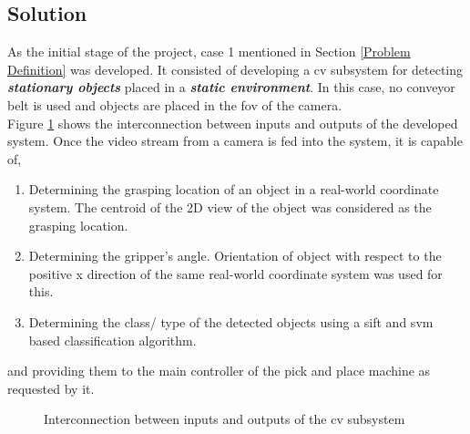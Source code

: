 \documentclass[a4paper,12pt]{report}%
\begin{document}
\subsection{Solution}
\label{cv_subsystem}
As the initial stage of the project, case 1 mentioned in Section \ref{Problem Definition} was developed. It consisted of developing a \ac{cv} subsystem for detecting \textbf{\textit{stationary objects}} placed in a \textbf{\textit{static environment}}. In this case, no conveyor belt is used and objects are placed in the \ac{fov} of the camera.\\

Figure \ref{fig:ioprocess} shows the interconnection between inputs and outputs of the developed system. Once the video stream from a camera is fed into the system, it is capable of,



\begin{enumerate}
	\item Determining the grasping location of an object in a real-world coordinate system. The centroid of the 2D view of the object was considered as the grasping location. 
	
	\item Determining the gripper's angle. Orientation of object with respect to the positive x direction of the same real-world coordinate system was used for this.
	
	\item  Determining the class/ type of the detected objects using a \ac{sift} and \ac{svm} based classification algorithm.
\end{enumerate}

and providing them to the main controller of the pick and place machine as requested by it. 

\begin{figure}[H]
	\centering
	
	\caption{Interconnection between inputs and outputs of the \ac{cv} subsystem}
	\label{fig:ioprocess}
\end{figure}
\end{document}

